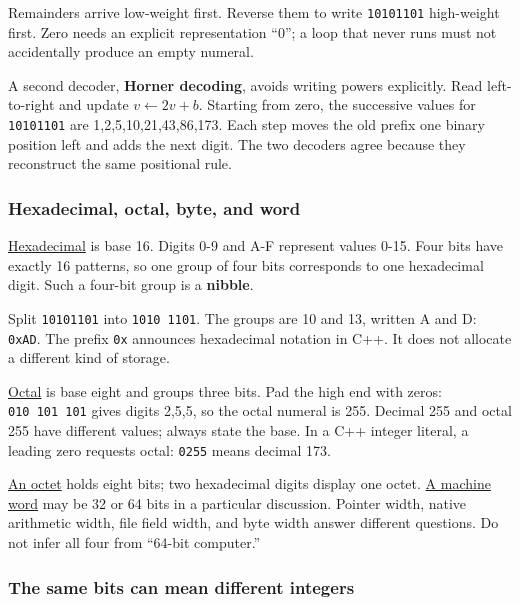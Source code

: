 Remainders arrive low-weight first. Reverse them to write \texttt{10101101} high-weight first. Zero needs an explicit representation ``0''; a loop that never runs must not accidentally produce an empty numeral.

A second decoder, \textbf{Horner decoding}, avoids writing powers explicitly. Read left-to-right and update \(v\leftarrow2v+b\). Starting from zero, the successive values for \texttt{10101101} are 1,2,5,10,21,43,86,173. Each step moves the old prefix one binary position left and adds the next digit. The two decoders agree because they reconstruct the same positional rule.

\subsubsection{Hexadecimal, octal, byte, and word}\label{05-engine-i-ch001-hexadecimal-octal-byte-and-word}

\hyperref[appendix-6b8075763724]{Hexadecimal} is base 16. Digits 0-9 and A-F represent values 0-15. Four bits have exactly 16 patterns, so one group of four bits corresponds to one hexadecimal digit. Such a four-bit group is a \textbf{nibble}.

Split \texttt{10101101} into \texttt{1010\ 1101}. The groups are 10 and 13, written A and D: \texttt{0xAD}. The prefix \texttt{0x} announces hexadecimal notation in C++. It does not allocate a different kind of storage.

\hyperref[appendix-17fc1bc8b305]{Octal} is base eight and groups three bits. Pad the high end with zeros: \texttt{010\ 101\ 101} gives digits 2,5,5, so the octal numeral is 255. Decimal 255 and octal 255 have different values; always state the base. In a C++ integer literal, a leading zero requests octal: \texttt{0255} means decimal 173.

\hyperref[appendix-5bee2df85484]{An octet} holds eight bits; two hexadecimal digits display one octet. \hyperref[appendix-d67a19507dc5]{A machine word} may be 32 or 64 bits in a particular discussion. Pointer width, native arithmetic width, file field width, and byte width answer different questions. Do not infer all four from ``64-bit computer.''

\subsubsection{The same bits can mean different integers}\label{05-engine-i-ch001-the-same-bits-can-mean-different-integers}

